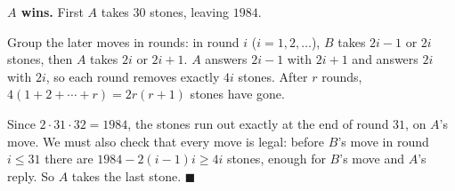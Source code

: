 \textbf{$A$ wins.} First $A$ takes $30$ stones, leaving $1984$.

Group the later moves in rounds: in round $i$ ($i=1,2,\dots$), $B$ takes $2i-1$ or $2i$ stones, then $A$ takes $2i$ or $2i+1$. $A$ answers $2i-1$ with $2i+1$ and answers $2i$ with $2i$, so each round removes exactly $4i$ stones. After $r$ rounds, $4(1+2+\cdots+r)=2r(r+1)$ stones have gone.

Since $2\cdot31\cdot32=1984$, the stones run out exactly at the end of round $31$, on $A$'s move. We must also check that every move is legal: before $B$'s move in round $i\le31$ there are $1984-2(i-1)i\ge 4i$ stones, enough for $B$'s move and $A$'s reply. So $A$ takes the last stone. $\blacksquare$
